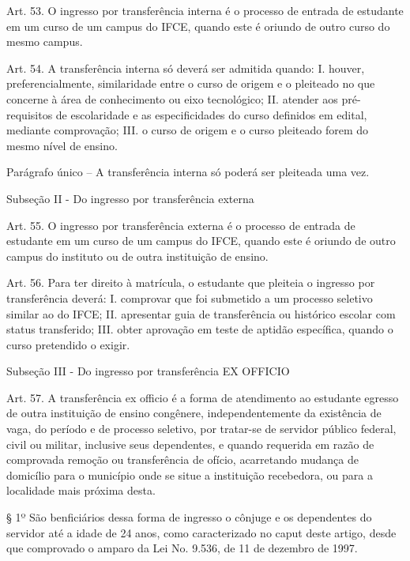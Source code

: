 \documentclass{paper}
\begin{document}
Art. 53. O ingresso por transferência interna é o processo de entrada de estudante em um curso de um campus do IFCE, quando este é oriundo de outro curso do mesmo campus.

Art. 54. A transferência interna só deverá ser admitida quando:
I. houver, preferencialmente, similaridade entre o curso de origem e o pleiteado no que concerne à área de conhecimento ou eixo tecnológico;
II. atender aos pré-requisitos de escolaridade e as especificidades do curso definidos em edital, mediante comprovação;
III. o curso de origem e o curso pleiteado forem do mesmo nível de ensino.

Parágrafo único – A transferência interna só poderá ser pleiteada uma vez.

\begin{center}
Subseção II - Do ingresso por transferência externa
\end{center}

Art. 55. O ingresso por transferência externa é o processo de entrada de estudante em um curso de um campus do IFCE, quando este é oriundo de outro campus do instituto ou de outra instituição de ensino.

Art. 56. Para ter direito à matrícula, o estudante que pleiteia o ingresso por transferência deverá:
I. comprovar que foi submetido a um processo seletivo similar ao do IFCE;
II. apresentar guia de transferência ou histórico escolar com status transferido;
III. obter aprovação em teste de aptidão específica, quando o curso pretendido o exigir.

\begin{center}
Subseção III - Do ingresso por transferência EX OFFICIO
\end{center}

Art. 57. A transferência ex officio é a forma de atendimento ao estudante egresso de outra instituição de ensino congênere, independentemente da existência de vaga, do período e de processo seletivo, por tratar-se de servidor público federal, civil ou militar, inclusive seus dependentes, e quando requerida em razão de comprovada remoção ou transferência de ofício, acarretando mudança de domicílio para o município onde se situe a instituição recebedora, ou para a localidade mais próxima desta.

§ 1º São benficiários dessa forma de ingresso o cônjuge e os dependentes do servidor até a idade de 24 anos, como caracterizado no caput deste artigo, desde que comprovado o amparo da Lei No. 9.536, de 11 de dezembro de 1997.
\end{document}
